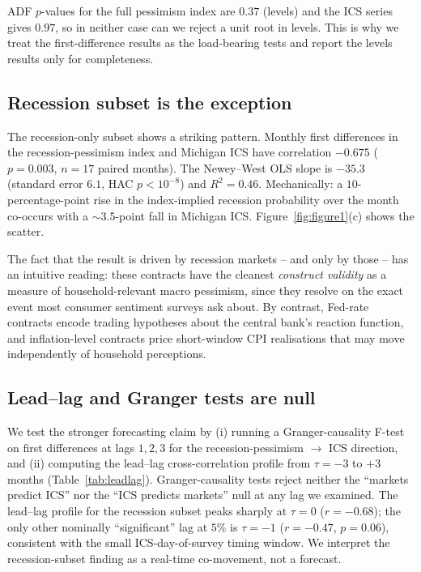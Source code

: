 \documentclass{article}
\begin{document}
ADF $p$-values for the full pessimism index are $0.37$ (levels) and
the ICS series gives $0.97$, so in neither case can we reject a unit
root in levels. This is why we treat the first-difference results as
the load-bearing tests and report the levels results only for
completeness.

\subsection{Recession subset is the exception}

The recession-only subset shows a striking pattern.
Monthly first differences in the recession-pessimism index and
Michigan ICS have correlation $-0.675$ ($p = 0.003$, $n = 17$ paired
months). The Newey--West OLS slope is $-35.3$ (standard error $6.1$,
HAC $p < 10^{-8}$) and $R^2 = 0.46$. Mechanically: a $10$-percentage-point
rise in the index-implied recession probability over the month
co-occurs with a $\sim 3.5$-point fall in Michigan ICS.
Figure~\ref{fig:figure1}(c) shows the scatter.

The fact that the result is driven by recession markets -- and only by
those -- has an intuitive reading: these contracts have the cleanest
\emph{construct validity} as a measure of household-relevant
macro pessimism, since they resolve on the exact event most consumer
sentiment surveys ask about. By contrast, Fed-rate contracts encode
trading hypotheses about the central bank's reaction function, and
inflation-level contracts price short-window CPI realisations
that may move independently of household perceptions.

\subsection{Lead--lag and Granger tests are null}

We test the stronger forecasting claim by (i) running a Granger-causality
F-test on first differences at lags $1,2,3$ for the recession-pessimism
$\to$ ICS direction, and (ii) computing the lead--lag cross-correlation
profile from $\tau = -3$ to $+3$ months
(Table~\ref{tab:leadlag}). Granger-causality tests reject neither the
``markets predict ICS'' nor the ``ICS predicts markets'' null at any
lag we examined. The lead--lag profile for the recession subset peaks
sharply at $\tau = 0$ ($r = -0.68$); the only other nominally
``significant'' lag at $5\%$ is $\tau = -1$ ($r = -0.47$, $p = 0.06$),
consistent with the small ICS-day-of-survey timing window. We
interpret the recession-subset finding as a real-time co-movement, not
a forecast.
\end{document}
